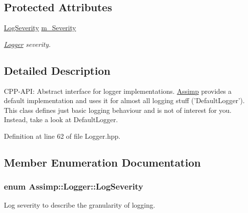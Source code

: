 \subsection*{Protected Attributes}
\begin{CompactItemize}
\item 
\hypertarget{class_assimp_1_1_logger_e1c96711eb927a5b33745a6211e93f56}{
\hyperlink{class_assimp_1_1_logger_8b6248a0fd062431e8572556350d29e6}{LogSeverity} \hyperlink{class_assimp_1_1_logger_e1c96711eb927a5b33745a6211e93f56}{m\_\-Severity}}
\label{class_assimp_1_1_logger_e1c96711eb927a5b33745a6211e93f56}

\begin{CompactList}\small\item\em \hyperlink{class_assimp_1_1_logger}{Logger} severity. \item\end{CompactList}\end{CompactItemize}


\subsection{Detailed Description}
CPP-API: Abstract interface for logger implementations. \hyperlink{namespace_assimp}{Assimp} provides a default implementation and uses it for almost all logging stuff ('DefaultLogger'). This class defines just basic logging behaviour and is not of interest for you. Instead, take a look at DefaultLogger. 

Definition at line 62 of file Logger.hpp.

\subsection{Member Enumeration Documentation}
\hypertarget{class_assimp_1_1_logger_8b6248a0fd062431e8572556350d29e6}{
\subsubsection[LogSeverity]{\setlength{\rightskip}{0pt plus 5cm}enum {\bf Assimp::Logger::LogSeverity}}}
\label{class_assimp_1_1_logger_8b6248a0fd062431e8572556350d29e6}


Log severity to describe the granularity of logging. 

